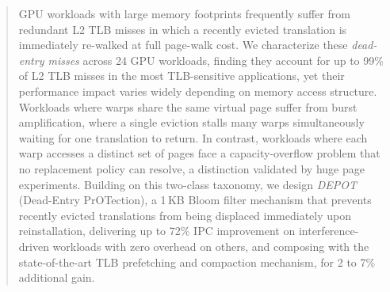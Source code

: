 \begin{abstract}
GPU workloads with large memory footprints frequently suffer from redundant L2 TLB misses
in which a recently evicted translation is immediately re-walked at full page-walk cost.
We characterize these \emph{dead-entry misses} across 24 GPU workloads, finding they
account for up to 99\% of L2 TLB misses in the most TLB-sensitive applications, yet their
performance impact varies widely depending on memory access structure.
Workloads where warps share the same virtual page suffer from burst amplification, where
a single eviction stalls many warps simultaneously waiting for one translation to return.
In contrast, workloads where each warp accesses a distinct set of pages face a
capacity-overflow problem that no replacement policy can resolve, a distinction validated
by huge page experiments.
Building on this two-class taxonomy, we design \emph{DEPOT} (Dead-Entry PrOTection),
a 1\,KB Bloom filter mechanism that prevents recently evicted translations from being
displaced immediately upon reinstallation, delivering up to 72\% IPC improvement on
interference-driven workloads with zero overhead on others, and composing with the state-of-the-art TLB prefetching and compaction mechanism,
for 2 to 7\% additional gain.
\end{abstract}
